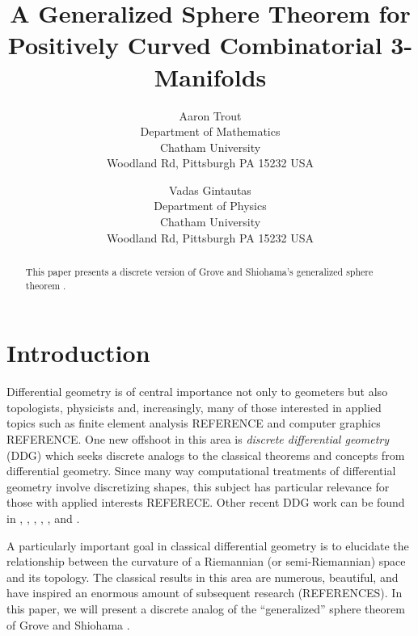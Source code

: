 \documentclass[12pt]{article}
\begin{document}
\nocite{*}

\title{A Generalized Sphere Theorem for Positively Curved Combinatorial 3-Manifolds}

\author{Aaron Trout \\ Department of Mathematics \\
Chatham University \\ Woodland Rd, Pittsburgh PA 15232 USA \and
Vadas Gintautas\\ Department of Physics \\
Chatham University \\ Woodland Rd, Pittsburgh PA 15232 USA}


\maketitle

\begin{abstract}
  This paper presents a discrete version of Grove and Shiohama's generalized sphere theorem \cite{groveshiohama}.
\end{abstract}


\section{Introduction}

Differential geometry is of central importance not only to geometers but also topologists, physicists and, increasingly, many of those interested in applied topics such as finite element analysis REFERENCE and computer graphics REFERENCE. One new offshoot in this area is {\em discrete differential geometry} (DDG) which seeks discrete analogs to the classical theorems and concepts from differential geometry. Since many way computational treatments of differential geometry involve discretizing shapes, this subject has particular relevance for those with applied interests REFERECE. Other recent DDG work can be found in \cite{BMM}, \cite{Crowley}, \cite{EMM}, \cite{forman2},
\cite{GGL}, \cite{LS} and \cite{stone}. 

A particularly important goal in classical differential geometry is to elucidate the relationship between the curvature of a Riemannian (or semi-Riemannian) space and its topology. The classical
results in this area are numerous, beautiful, and have inspired an
enormous amount of subsequent research (REFERENCES). In this paper, we will present a discrete analog of the ``generalized'' sphere theorem of Grove and Shiohama \cite{groveshiohama}.
\end{document}
